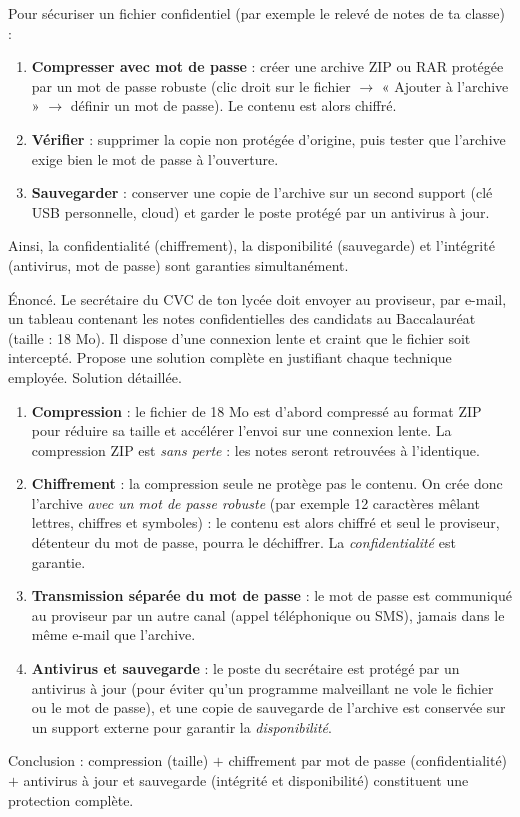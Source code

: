 \documentclass[11pt]{article}
\begin{document}
\begin{methode}
Pour sécuriser un fichier confidentiel (par exemple le relevé de notes de ta classe) :
\begin{enumerate}
  \item \textbf{Compresser avec mot de passe} : créer une archive ZIP ou RAR protégée par un mot de passe robuste (clic droit sur le fichier $\rightarrow$ « Ajouter à l'archive » $\rightarrow$ définir un mot de passe). Le contenu est alors chiffré.
  \item \textbf{Vérifier} : supprimer la copie non protégée d'origine, puis tester que l'archive exige bien le mot de passe à l'ouverture.
  \item \textbf{Sauvegarder} : conserver une copie de l'archive sur un second support (clé USB personnelle, cloud) et garder le poste protégé par un antivirus à jour.
\end{enumerate}
Ainsi, la confidentialité (chiffrement), la disponibilité (sauvegarde) et l'intégrité (antivirus, mot de passe) sont garanties simultanément.
\end{methode}

\begin{exoresolu}
Énoncé. Le secrétaire du CVC de ton lycée doit envoyer au proviseur, par e-mail, un tableau contenant les notes confidentielles des candidats au Baccalauréat (taille : 18 Mo). Il dispose d'une connexion lente et craint que le fichier soit intercepté. Propose une solution complète en justifiant chaque technique employée.
\tcblower
Solution détaillée.
\begin{enumerate}
  \item \textbf{Compression} : le fichier de 18 Mo est d'abord compressé au format ZIP pour réduire sa taille et accélérer l'envoi sur une connexion lente. La compression ZIP est \emph{sans perte} : les notes seront retrouvées à l'identique.
  \item \textbf{Chiffrement} : la compression seule ne protège pas le contenu. On crée donc l'archive \emph{avec un mot de passe robuste} (par exemple 12 caractères mêlant lettres, chiffres et symboles) : le contenu est alors chiffré et seul le proviseur, détenteur du mot de passe, pourra le déchiffrer. La \emph{confidentialité} est garantie.
  \item \textbf{Transmission séparée du mot de passe} : le mot de passe est communiqué au proviseur par un autre canal (appel téléphonique ou SMS), jamais dans le même e-mail que l'archive.
  \item \textbf{Antivirus et sauvegarde} : le poste du secrétaire est protégé par un antivirus à jour (pour éviter qu'un programme malveillant ne vole le fichier ou le mot de passe), et une copie de sauvegarde de l'archive est conservée sur un support externe pour garantir la \emph{disponibilité}.
\end{enumerate}
Conclusion : compression (taille) $+$ chiffrement par mot de passe (confidentialité) $+$ antivirus à jour et sauvegarde (intégrité et disponibilité) constituent une protection complète.
\end{exoresolu}
\end{document}
